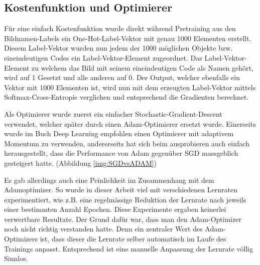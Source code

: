\subsection{Kostenfunktion und Optimierer}
Für eine einfach Kostenfunktion wurde direkt während Pretraining aus den Bildnamen-Labels ein One-Hot-Label-Vektor mit genau 1000 Elementen erstellt.
Diesem Label-Vektor wurden nun jedem der 1000 möglichen Objekte bzw. eineindeutigen Codes ein Label-Vektor-Element zugeordnet. 
Das Label-Vektor-Element zu welchem das Bild mit seinem eineindeutigen Code als Namen gehört, wird auf 1 Gesetzt und alle anderen auf 0.
Der Output, welcher ebenfalls ein Vektor mit 1000 Elementen ist, wird nun mit dem erzeugten Label-Vektor mittels Softmax-Cross-Entropie verglichen und entsprechend die Gradienten berechnet. 

Als Optimierer wurde zuerst ein einfacher Stochastic-Gradient-Descent verwendet, welcher später durch einen Adam-Optimierer ersetzt wurde. 
Einerseits wurde im Buch Deep Learning \cite{deeplearning} empfohlen einen Optimierer mit adaptivem Momentum zu verwenden, andererseits hat sich beim ausprobieren auch einfach herausgestellt, dass die Performance von Adam gegenüber SGD massgeblich gesteigert hatte. (Abbildung \ref{img:SGDvsADAM})

Es gab allerdings auch eine Peinlichkeit im Zusammenhang mit dem Adamoptimizer.
So wurde in dieser Arbeit viel mit verschiedenen Lernraten experimentiert, wie z.B. eine regelmässige Reduktion der Lernrate nach jeweils einer bestimmten Anzahl Epochen.
Diese Experimente ergaben keinerlei verwertbare Resultate.
Der Grund dafür war, dass man den Adam-Optimizer noch nicht richtig verstanden hatte.
Denn ein zentraler Wert des Adam-Optimizers ist, dass dieser die Lernrate selber automatisch im Laufe des Trainings anpasst.
Entsprechend ist eine \grqq{}manuelle\grqq{} Anpassung der Lernrate völlig Sinnlos.

